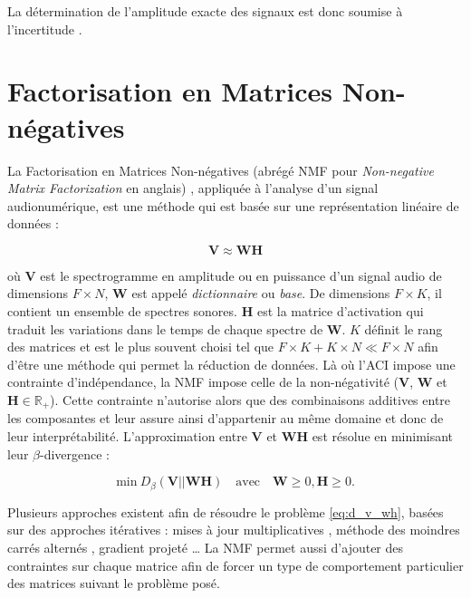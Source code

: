 La détermination de l'amplitude exacte des signaux est donc soumise à l'incertitude \cite{naik2011overview}.

\section{Factorisation en Matrices Non-négatives}

La Factorisation en Matrices Non-négatives (abrégé NMF pour \textit{Non-negative Matrix Factorization} en anglais) \cite{lee_learning_1999}, appliquée à l'analyse d'un signal audionumérique, est une méthode qui est basée sur une représentation linéaire de données :

\begin{equation}
\mathbf{V} \approx  \mathbf{WH}
\end{equation}

où $\mathbf{V}$ est le spectrogramme en amplitude ou en puissance d'un signal audio de dimensions $F \times N$, $\mathbf{W}$ est appelé \textit{dictionnaire} ou \textit{base}. De dimensions $F \times K$, il contient un ensemble de spectres sonores. $\mathbf{H}$ est la matrice d'activation qui traduit les variations dans le temps de chaque spectre de $\mathbf{W}$.  $K$ définit le rang des matrices et est le plus souvent choisi tel que $F\times K + K \times N \ll F \times N$ afin d'être une méthode qui permet la réduction de données.
Là où l'ACI impose une contrainte d'indépendance, la NMF impose celle de la \og non-négativité \fg{} ($\mathbf{V}$, $\mathbf{W}$ et $\mathbf{H} \in \mathbb{R}_+$). Cette contrainte n'autorise alors que des combinaisons additives entre les composantes et leur assure ainsi d'appartenir au même domaine et donc de leur interprétabilité. 
L'approximation entre $\mathbf{V}$ et $\mathbf{WH}$ est résolue en minimisant leur $\beta$-divergence :

\begin{equation}\label{eq:d_v_wh}
\text{min}~D_{\beta}\left(\textbf{V} \vert\vert \textbf{WH}\right) \quad \text{avec} \quad \mathbf{W} \geq 0, \mathbf{H} \geq 0.
\end{equation}

Plusieurs approches existent afin de résoudre le problème \ref{eq:d_v_wh}, basées sur des approches itératives : mises à jour multiplicatives \cite{lee_algorithms_2000}, méthode des moindres carrés alternés \cite{cichocki_regularized_2007}, gradient projeté \cite{lin_projected_2007} \dots{} La NMF permet aussi d'ajouter des contraintes sur chaque matrice \cite{virtanen_monaural_2007, bertin2010enforcing} afin de forcer un type de comportement particulier des matrices suivant le problème posé.

